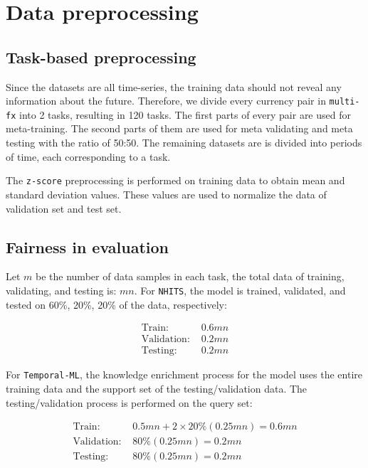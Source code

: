 \documentclass[a4paper,fleqn]{cas-sc}
\begin{document}
\appendix

\section{Data preprocessing}
\label{app:preprocessing}

\subsection{Task-based preprocessing}

Since the datasets are all time-series, the training data should not reveal any information about the future. Therefore, we divide every currency pair in \verb|multi-fx| into 2 tasks, resulting in 120 tasks. The first parts of every pair are used for meta-training. The second parts of them are used for meta validating and meta testing with the ratio of 50:50. The remaining datasets are is divided into periods of time, each corresponding to a task.

\vspace{1mm}

The \verb|z-score| preprocessing is performed on training data to obtain mean and standard deviation values. These values are used to normalize the data of validation set and test set.

\subsection{Fairness in evaluation}

Let $m$ be the number of data samples in each task, the total data of training, validating, and testing is: $mn$. For \verb|NHITS|, the model is trained, validated, and tested on 60\%, 20\%, 20\% of the data, respectively:

\begin{align}
    \text{Train: } &0.6mn\\
    \text{Validation: } &0.2mn\\
    \text{Testing: } &0.2mn
\end{align}

For \verb|Temporal-ML|, the knowledge enrichment process for the model uses the entire training data and the support set of the testing/validation data. The testing/validation process is performed on the query set:

\begin{align}
    \text{Train: } &0.5mn + 2\times 20\%(0.25mn) = 0.6mn\\
    \text{Validation: } &80\% (0.25mn)  =0.2mn\\
    \text{Testing: } &80\% (0.25mn)  =0.2mn
\end{align}
\end{document}
